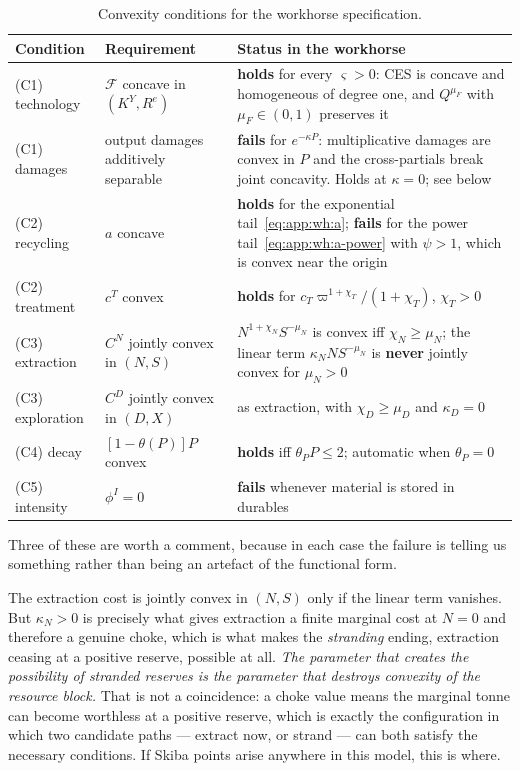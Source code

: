 \begin{table}[H]
\centering
\caption{Convexity conditions for the workhorse specification.}\label{tab:app:suff}
\begin{tabular}{L{2.4cm}L{5.6cm}L{5.8cm}}
\toprule
Condition & Requirement & Status in the workhorse \\
\midrule
(C1) technology &
$\mathcal F$ concave in $\left(K^Y,R^{e}\right)$ &
\textbf{holds} for every $\varsigma>0$: CES is concave and homogeneous of degree one, and $Q^{\mu_F}$ with $\mu_F\in\left(0,1\right)$ preserves it \\
(C1) damages &
output damages additively separable &
\textbf{fails} for $e^{-\kappa P}$: multiplicative damages are convex in $P$ and the cross-partials break joint concavity. Holds at $\kappa=0$; see below \\
(C2) recycling &
$a$ concave &
\textbf{holds} for the exponential tail~\eqref{eq:app:wh:a}; \textbf{fails} for the power tail~\eqref{eq:app:wh:a-power} with $\psi>1$, which is convex near the origin \\
(C2) treatment &
$c^T$ convex &
\textbf{holds} for $c_T\varpi^{1+\chi_T}/\left(1+\chi_T\right)$, $\chi_T>0$ \\
(C3) extraction &
$C^N$ jointly convex in $\left(N,S\right)$ &
$N^{1+\chi_N}S^{-\mu_N}$ is convex iff $\chi_N\ge\mu_N$; the linear term $\kappa_NNS^{-\mu_N}$ is \textbf{never} jointly convex for $\mu_N>0$ \\
(C3) exploration &
$C^D$ jointly convex in $\left(D,X\right)$ &
as extraction, with $\chi_D\ge\mu_D$ and $\kappa_D=0$ \\
(C4) decay &
$\left[1-\theta\left(P\right)\right]P$ convex &
\textbf{holds} iff $\theta_PP\le2$; automatic when $\theta_P=0$ \\
(C5) intensity &
$\phi^I=0$ &
\textbf{fails} whenever material is stored in durables \\
\bottomrule
\end{tabular}
\end{table}

Three of these are worth a comment, because in each case the failure is telling us something rather than being an artefact of the functional form.

 The extraction cost is jointly convex in $\left(N,S\right)$ only if the linear term vanishes. But $\kappa_N>0$ is precisely what gives extraction a finite marginal cost at $N=0$ and therefore a genuine choke, which is what makes the \emph{stranding} ending, extraction ceasing at a positive reserve, possible at all. \emph{The parameter that creates the possibility of stranded reserves is the parameter that destroys convexity of the resource block.} That is not a coincidence: a choke value means the marginal tonne can become worthless at a positive reserve, which is exactly the configuration in which two candidate paths --- extract now, or strand --- can both satisfy the necessary conditions. If Skiba points arise anywhere in this model, this is where.

